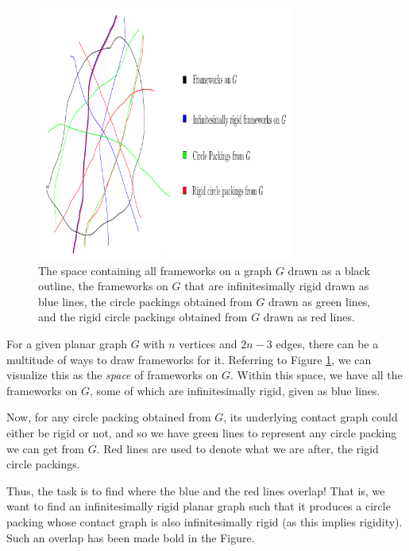 \begin{figure}[htbp]
    \centering
    \includegraphics[width = 0.75\textwidth]{Chapter 4/5. configuration space.png}
    \caption{The space containing all frameworks on a graph $G$ drawn as a black outline, the frameworks on $G$ that are infinitesimally rigid drawn as blue lines, the circle packings obtained from $G$ drawn as green lines, and the rigid circle packings obtained from $G$ drawn as red lines.}
    \label{fig4: config space}
\end{figure}

\begin{flushleft}
For a given planar graph $G$ with $n$ vertices and $2n - 3$ edges, there can be a multitude of ways to draw frameworks for it. Referring to Figure \ref{fig4: config space}, we can visualize this as the \textit{space} of frameworks on $G$. Within this space, we have all the frameworks on $G$, some of which are infinitesimally rigid, given as blue lines.  
\end{flushleft}

\begin{flushleft}
Now, for any circle packing obtained from $G$, its underlying contact graph could either be rigid or not, and so we have green lines to represent any circle packing we can get from $G$. Red lines are used to denote what we are after, the rigid circle packings. 
\end{flushleft}

\begin{flushleft}
Thus, the task is to find where the blue and the red lines overlap! That is, we want to find an infinitesimally rigid planar graph such that it produces a circle packing whose contact graph is also infinitesimally rigid (as this implies rigidity). Such an overlap has been made bold in the Figure. 
\end{flushleft}

